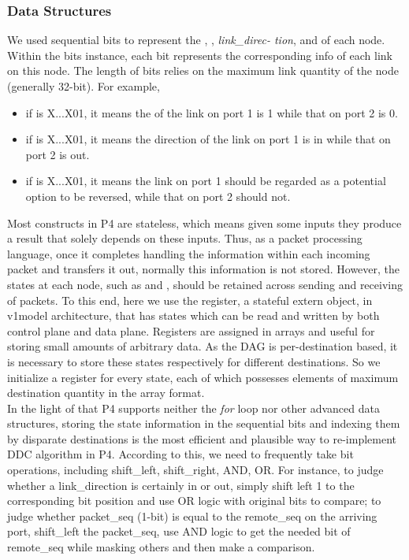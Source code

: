\subsubsection{Data Structures}
We used sequential bits to represent the \ls, \rs, \textit{link\_direc- tion}, and \tr of each node. Within the bits instance, each bit represents the corresponding info  of each link on this node. The length of bits relies on the maximum link quantity of the node (generally 32-bit). For example, 
\begin{itemize}
\item if \ls is X...X01, it means the \ls of the link on port 1 is 1 while that on port 2 is 0.
\item if \ld is X...X01, it means the direction of the link on port 1 is in while that on port 2 is out.
\item if \tr is X...X01, it means the link on port 1 should be regarded as a potential option to be reversed, while that on port 2 should not.
\end{itemize}
Most constructs in P4 are stateless, which means given some inputs they produce a result that solely depends on these inputs. 
Thus, as a packet processing language, once it completes handling the information within each incoming packet and transfers it out, normally this information is not stored. 
However, the states at each node, such as \ls and \rs, should be retained across sending and receiving of packets. 
To this end, here we use the register, a stateful extern object, in v1model architecture, that has states which can be read and written by both control plane and data plane. 
Registers are assigned in arrays and useful for storing small amounts of arbitrary data. 
As the DAG is per-destination based, it is necessary to store these states respectively for different destinations. 
So we initialize a register for every state, each of which possesses elements of maximum destination quantity in the array format.\\

In the light of that P4 supports neither the \textit{for} loop nor other advanced data structures, storing the state information in the sequential bits and indexing them by disparate destinations is the most efficient and plausible way to re-implement DDC algorithm in P4. According to this, we need to frequently take bit operations, including shift\_left, shift\_right, AND, OR.  For instance, to judge whether a link\_direction is certainly in or out, simply shift left 1 to the corresponding bit position and use OR logic with original bits to compare; to judge whether packet\_seq (1-bit) is equal to the remote\_seq on the arriving port, shift\_left the packet\_seq, use AND logic to get the needed bit of remote\_seq while masking others and then make a comparison.

